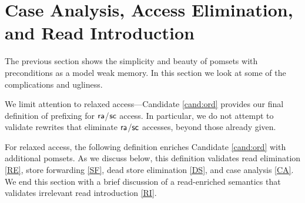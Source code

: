 \section{Case Analysis, Access Elimination, and Read Introduction}
\label{sec:refine}

The previous section shows the simplicity and beauty of pomsets with
preconditions as a model weak memory.  In this section we look at some of the
complications and ugliness.

We limit attention to relaxed access---Candidate \ref{cand:ord} provides our
final definition of prefixing for ${\mathsf{ra}}$/${\mathsf{sc}}$ access.  In particular,
we do not attempt to validate rewrites that eliminate ${\mathsf{ra}}$/${\mathsf{sc}}$
accesses, beyond those already given.  

For relaxed access, the following definition enriches Candidate
\ref{cand:ord} with additional pomsets.  As we discuss below, this definition
validates read elimination \eqref{RE}, store forwarding \eqref{SF}, dead
store elimination \eqref{DS}, and case analysis \eqref{CA}.  We end this
section with a brief discussion of a read-enriched semantics that validates
irrelevant read introduction \eqref{RI}.

